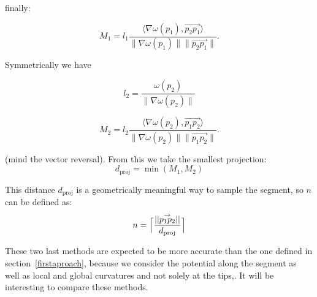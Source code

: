 \documentclass[11pt,a4paper]{article}
\newcommand{\gvec}[1]{\ensuremath{\overset{\rightarrow}{#1}}}
\newcommand{\scal}[2]{\ensuremath{\langle #1 , #2 \rangle}}
\begin{document}
finally:

\begin{equation}
M_1 = l_1 \frac{\scal{\nabla \omega(p_1)}{\gvec{p_2p_1}}}{\|\nabla \omega(p_1)\|\|\gvec{p_2p_1}\|}.
\end{equation}

Symmetrically we have

\begin{equation}
l_2 = \frac{\omega(p_2)}{\|\nabla \omega(p_2)\|}
\end{equation}

\begin{equation}
M_2 = l_2 \frac{\scal{\nabla \omega(p_2)}{\gvec{p_1p_2}}}{\|\nabla \omega(p_2)\|\|\gvec{p_1p_2}\|}.
\end{equation}

(mind the vector reversal). From this we take the smallest projection:
\begin{equation}
d_{\text{proj}} = \min(M_1,M_2)
\end{equation}

This distance $d_{\text{proj}}$ is a geometrically meaningful way to sample the segment, so $n$ can be defined as:
\begin{equation}
n = \Bigl\lceil\frac{||\gvec{p_1p_2}||}{d_{\text{proj}}}\Bigr\rceil
\end{equation}

These two last methods are expected to be more accurate than the one defined in section~\ref{firstaproach}, because we consider the potential along the segment as well as local and global curvatures and not solely at the tips,. It will be interesting to compare these methods.
\end{document}
